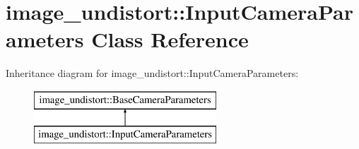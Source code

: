 \hypertarget{classimage__undistort_1_1InputCameraParameters}{}\section{image\+\_\+undistort\+:\+:Input\+Camera\+Parameters Class Reference}
\label{classimage__undistort_1_1InputCameraParameters}
Inheritance diagram for image\+\_\+undistort\+:\+:Input\+Camera\+Parameters\+:\begin{figure}[H]
\begin{center}
\leavevmode
\includegraphics[height=2.000000cm]{classimage__undistort_1_1InputCameraParameters}
\end{center}
\end{figure}
